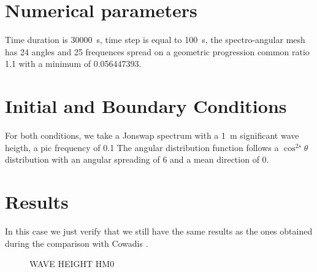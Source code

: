 %
\section{Numerical parameters}
%
Time duration is 30000~s, time step is equal to 100~s, the spectro-angular mesh has 24 angles and 25 frequences spread on a geometric progression common ratio 1.1 with a minimum of 0.056447393.

\section{Initial and Boundary Conditions}
%
For both conditions, we take a Jonswap spectrum with a 1~m significant wave heigth, a pic frequency of 0.1 The angular distribution function follows a $\cos^{2s} \theta$ distribution with an angular spreading of 6 and a mean direction of 0.


%
%
\section{Results}
In this case we just verify that we still have the same results as the ones obtained during the comparison with Cowadis \cite{cowadis}.
\begin{figure} [!h]
\centering
{}
 \caption{WAVE HEIGHT HM0}\label{resultsbf}
\end{figure}
